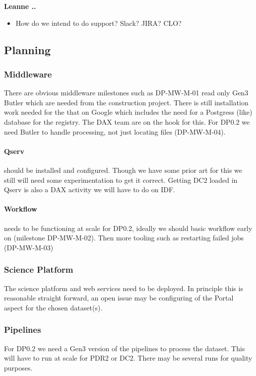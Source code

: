 {\bf Leanne .. }

\begin{itemize}
\item How do we intend to do support? Slack? JIRA? CLO?
\end{itemize}


\subsection{Planning}

\subsubsection{Middleware}
There are obvious middleware milestones such as DP-MW-M-01 read only Gen3 Butler which are needed from the construction project.
There is still installation work needed for the that on Google which includes the need for a Postgress (like) database for the registry. The DAX team are on the hook for this.
For DP0.2 we need Butler to handle processing, not just locating files (DP-MW-M-04).

\paragraph{Qserv} should be installed  and configured. Though we have some prior art for this we
still will need some experimentation to get it correct. Getting DC2 loaded in Qserv is also a DAX activity
we will have to do on IDF.

\paragraph{Workflow} needs to be functioning at scale for DP0.2, ideally we should basic workflow
early on (milestone DP-MW-M-02). Then more tooling such as restarting failed jobs (DP-MW-M-03)

\subsubsection{ Science Platform}
The science platform and web services need to be deployed. In principle this is reasonable straight forward, an open issue may be configuring of the Portal aspect for the chosen  dataset(s).

\subsubsection{ Pipelines }
For DP0.2 we need a Gen3 version of the pipelines to process the dataset. This will have to run at scale for PDR2 or DC2. There may be several runs for quality purposes.


